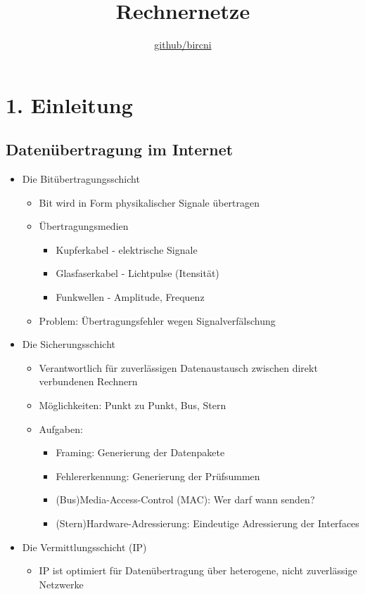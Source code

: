 \documentclass{scrreprt}
\title{Rechnernetze}
\author{\href{https://github.com/bircni}{\color{black}github/bircni}}
\date{}
\begin{document}
\maketitle
\section*{1. Einleitung}
\subsection*{Datenübertragung im Internet}
\begin{itemize}
	\item Die Bitübertragungsschicht
	\begin{itemize}
		\item Bit wird in Form physikalischer Signale übertragen
		\item Übertragungsmedien
		\begin{itemize}
			\item Kupferkabel - elektrische Signale
			\item Glasfaserkabel - Lichtpulse (Itensität)
			\item Funkwellen - Amplitude, Frequenz
		\end{itemize}
		\item Problem: Übertragungsfehler wegen Signalverfälschung
	\end{itemize}
	\item Die Sicherungsschicht
	\begin{itemize}
		\item Verantwortlich für zuverlässigen Datenaustausch zwischen direkt verbundenen Rechnern
		\item Möglichkeiten: Punkt zu Punkt, Bus, Stern
		\item Aufgaben:
		\begin{itemize}
			\item Framing: Generierung der Datenpakete
			\item Fehlererkennung: Generierung der Prüfsummen
			\item (Bus)Media-Access-Control (MAC): Wer darf wann senden?
			\item (Stern)Hardware-Adressierung: Eindeutige Adressierung der Interfaces
		\end{itemize}
	\end{itemize}
	\item Die Vermittlungsschicht (IP)
	\begin{itemize}
		\item IP ist optimiert für Datenübertragung über heterogene, nicht zuverlässige Netzwerke

\end{itemize}
\end{itemize}
\end{document}
